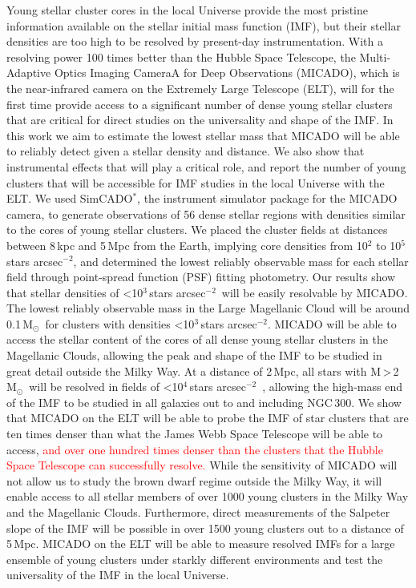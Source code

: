 \documentclass[referee]{aa}
\newcommand{\msun}{M$_\odot$~}
\newcommand{\h}[1]{$^{#1}$}
\newcommand{\spa}{stars arcsec$^{-2}$~}
\newcommand{\spae}{stars arcsec$^{-2}$}
\newcommand{\langedit}[1]{\textcolor{red}{#1}}
\begin{document}
  \abstract
{Young stellar cluster cores in the local Universe provide the most pristine information available on the stellar initial mass function (IMF), but their stellar densities are too high to be resolved by present-day instrumentation.
With a resolving power 100 times better than the Hubble Space Telescope, the Multi-Adaptive Optics Imaging CameraA for Deep Observations (MICADO), which is the near-infrared camera on the Extremely Large Telescope (ELT), will for the first time provide access to a significant number of dense young stellar clusters that are critical for direct studies on the universality and shape of the IMF.}
{In this work we aim to estimate the lowest stellar mass that MICADO will be able to reliably detect given a stellar density and distance.
We also show that instrumental effects that will play a critical role, and report the number of young clusters that will be accessible for IMF studies in the local Universe with the ELT.}
{We used SimCADO$^*$, the instrument simulator package for the MICADO camera, to generate observations of 56 dense stellar regions with densities similar to the cores of young stellar clusters.
We placed the cluster fields at distances between 8\,kpc and 5\,Mpc from the Earth, implying core densities from 10\h2 to 10\h5\,\spae, and determined the lowest reliably observable mass for each stellar field through point-spread function (PSF) fitting photometry.}
{Our results show that stellar densities of \textless10\h3\,\spa will be easily resolvable by MICADO. The lowest reliably observable mass in the Large Magellanic Cloud will be around 0.1\,\msun for clusters with densities \textless10\h3\,\spae.
MICADO will be able to access the stellar content of the cores of all dense young stellar clusters in the Magellanic Clouds, allowing the peak and shape of the IMF to be studied in great detail outside the Milky Way.
At a distance of 2\,Mpc, all stars with M\,\textgreater\,2\,\msun will be resolved in fields of \textless10\h4\,\spa, allowing the high-mass end of the IMF to be studied in all galaxies out to and including NGC\,300.}
{We show that MICADO on the ELT will be able to probe the IMF of star clusters that are ten times denser than what the James Webb Space Telescope will be able to access,
\langedit{and over one hundred times denser than the clusters that the Hubble Space Telescope can successfully resolve.}
While the sensitivity of MICADO will not allow us to study the brown dwarf regime outside the Milky Way, it will enable access to all stellar members of over 1000 young clusters in the Milky Way and the Magellanic Clouds.
Furthermore, direct measurements of the Salpeter slope of the IMF will be possible in over 1500 young clusters out to a distance of 5\,Mpc.
MICADO on the ELT will be able to measure resolved IMFs for a large ensemble of young clusters under starkly different environments and test the universality of the IMF in the local Universe.}
\end{document}
